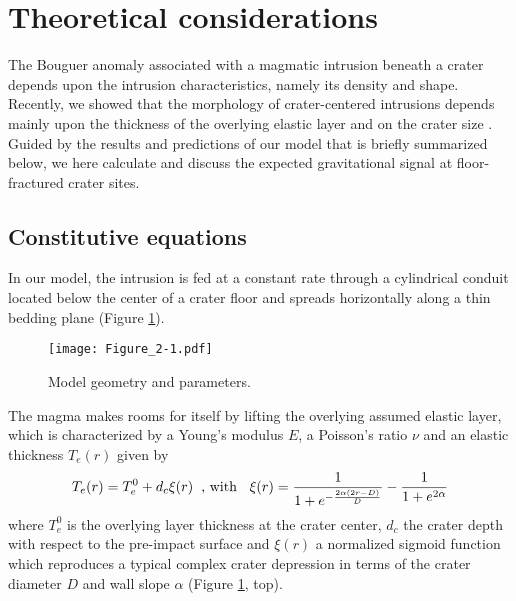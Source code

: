 \section{Theoretical considerations}
\label{sec:theor-cons}

The Bouguer  anomaly associated  with a  magmatic intrusion  beneath a
crater depends upon the  intrusion characteristics, namely its density
and shape.  Recently, we showed that the morphology of crater-centered
intrusions depends mainly upon the  thickness of the overlying elastic
layer and  on the  crater size  \citep{Thorey:2014cv}.  Guided  by the
results and predictions of our model that is briefly summarized below,
we here  calculate and  discuss the  expected gravitational  signal at
floor-fractured crater sites.

\subsection{Constitutive equations}
\label{sec:const-equat-1}

In  our model,  the intrusion  is  fed at  a constant  rate through  a
cylindrical conduit  located below  the center of  a crater  floor and
spreads   horizontally   along   a    thin   bedding   plane   (Figure
\ref{Figure2-1}).
\begin{figure}[pb]
    \graphicspath{ {/Users/thorey/Documents/These/Projet/FFC/Gravi_GRAIL/Article/Papier/Proof/} }
  \begin{center}
    \texttt{[image: Figure\_2-1.pdf]}
    \caption{Model geometry and parameters.}
    \label{Figure2-1}
  \end{center}
\end{figure}
The  magma makes  rooms for  itself by  lifting the  overlying assumed
elastic  layer, which  is characterized  by a  Young's modulus  $E$, a
Poisson's ratio $\nu$ and an elastic thickness $T_e(r)$ given by
\begin{equation}
  T_e(r)=T_e^0+d_c\xi(r)\hspace{.2cm}\text{, with }\hspace{.2cm} \xi(r)=\frac{1}{1+e^{-\frac{2\alpha(2r-D)}{D}}}-\frac{1}{1+e^{2\alpha}}\label{topo}\\
\end{equation}
where $T_e^0$ is  the overlying layer thickness at  the crater center,
$d_c$  the crater  depth with  respect to  the pre-impact  surface and
$\xi(r)$  a normalized  sigmoid  function which  reproduces a  typical
complex crater depression in terms of the crater diameter $D$ and wall
slope $\alpha$ (Figure \ref{Figure2-1}, top).

